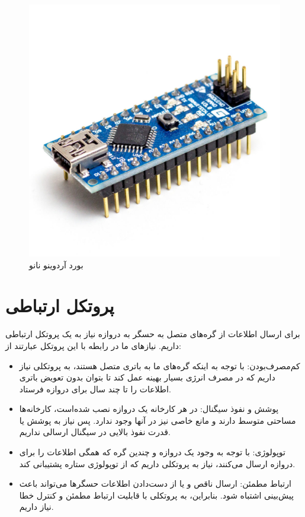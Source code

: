 \begin{figure}[!h]
\centering\includegraphics[scale=0.15]{arduino_nano.png}
\caption{بورد آردوینو نانو}\label{fig:arduino_nano}
\end{figure}

\section{پروتکل ارتباطی}

برای ارسال اطلاعات از گره‌های متصل به حسگر به دروازه نیاز به یک پروتکل ارتباطی داریم. نیازهای ما در رابطه با این پروتکل عبارتند از:
\begin{itemize}
\item کم‌مصرف‌بودن: با توجه به اینکه گره‌های ما به باتری متصل هستند، به پروتکلی نیاز داریم که در مصرف انرژی بسیار بهینه عمل کند تا بتوان بدون تعویض باتری اطلاعات را تا چند سال برای دروازه فرستاد.
\item پوشش و نفوذ سیگنال: در هر کارخانه یک دروازه نصب شده‌است، کارخانه‌ها مساحتی متوسط دارند و مانع خاصی نیز در آنها وجود ندارد. پس نیاز به پوشش یا قدرت نفوذ بالایی در سیگنال ارسالی نداریم.
\item توپولوژی: با توجه به وجود یک دروازه و چندین گره که همگی اطلاعات را برای دروازه ارسال می‌کنند، نیاز به پروتکلی داریم که از توپولوژی ستاره پشتیبانی کند.
\item ارتباط مطمئن: ارسال ناقص و یا از دست‌دادن اطلاعات حسگرها می‌تواند باعث پیش‌بینی اشتباه شود. بنابراین، به پروتکلی با قابلیت ارتباط مطمئن و کنترل خطا نیاز داریم.
\end{itemize}


